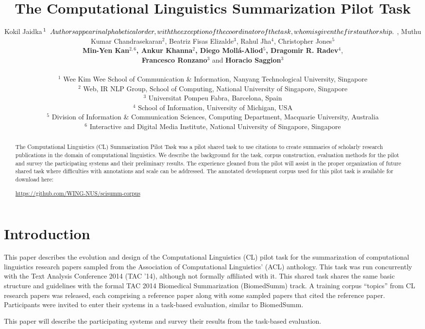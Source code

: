 \documentclass[11pt]{article}
\title{The Computational Linguistics Summarization Pilot Task}
\author{Kokil Jaidka$^{1}\relax{\hspace{.2cm}Authors appear in alphabetical order, with the exception of the coordinator of the task, whom is given the first authorship.} $ , Muthu Kumar Chandrasekaran$^{2}$, Beatriz Fisas Elizalde$^{3}$, Rahul Jha$^{4}$, Christopher Jones$^{5}$ \\ {\bf Min-Yen Kan}$^{2,6}${\bf , Ankur Khanna}$^{2}${\bf , Diego Moll\'{a}-Aliod}$^{5}${\bf , Dragomir R. Radev}$^{4}$, \\ {\bf Francesco Ronzano}$^{3}$ and {\bf Horacio Saggion}$^{3}$ \\ 
\\
$^1$ Wee Kim Wee School of Communication \& Information, Nanyang Technological University, Singapore \\
$^2$ Web, IR \/ NLP Group, School of Computing, National University of Singapore, Singapore \\
$^3$ Universitat Pompeu Fabra, Barcelona, Spain\\
$^4$ School of Information, University of Michigan, USA\\
$^5$ Division of Information \& Communication Sciences, Computing Department, Macquarie University, Australia \\
$^6$ Interactive and Digital Media Institute, National University of Singapore, Singapore}
\date{}
\begin{document}
\maketitle
\begin{abstract}
The Computational Linguistics (CL) Summarization Pilot Task was a pilot shared task to use citations to create summaries of scholarly research publications in the domain of computational linguistics.  We describe the background for the task, corpus construction, evaluation methods for the pilot and survey the participating systems and their preliminary results.  The experience gleaned from the pilot will assist in the proper organization of future shared task where difficulties with annotations and scale can be addressed. The annotated development corpus used for this pilot task is available for download 
here: \begin{sloppypar}
\url{https://github.com/WING-NUS/scisumm-corpus}
\end{sloppypar}
\end{abstract}

\section{Introduction}

This paper describes the evolution and design of the Computational Linguistics (CL) pilot task for the summarization of computational linguistics research papers sampled from the Association of Computational Linguistics' (ACL) anthology. This task was run concurrently with the Text Analysis Conference 2014 (TAC '14), although not formally affiliated with it. This shared task shares the same basic structure and guidelines with the formal TAC 2014 Biomedical Summarization (BiomedSumm) track. A training corpus ``topics'' from CL research papers was released, each comprising a reference paper along with some sampled papers that cited the reference paper. Participants were invited to enter their systems in a task-based evaluation, similar to BiomedSumm.

This paper will describe the participating systems and survey their results from the task-based evaluation.

\end{document}
